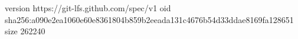 version https://git-lfs.github.com/spec/v1
oid sha256:a090e2ea1060e60e8361804b859b2eeada131c4676b54d33ddae8169fa128651
size 262240
